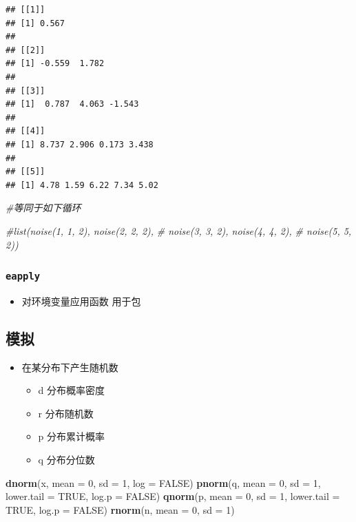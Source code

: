 \documentclass[]{book}
\newenvironment{Shaded}{\begin{snugshade}}{\end{snugshade}}
\newcommand{\CommentTok}[1]{\textcolor[rgb]{0.56,0.35,0.01}{\textit{#1}}}
\newcommand{\DataTypeTok}[1]{\textcolor[rgb]{0.13,0.29,0.53}{#1}}
\newcommand{\DecValTok}[1]{\textcolor[rgb]{0.00,0.00,0.81}{#1}}
\newcommand{\KeywordTok}[1]{\textcolor[rgb]{0.13,0.29,0.53}{\textbf{#1}}}
\newcommand{\NormalTok}[1]{#1}
\newcommand{\OtherTok}[1]{\textcolor[rgb]{0.56,0.35,0.01}{#1}}
\providecommand{\tightlist}{%
  \setlength{\itemsep}{0pt}\setlength{\parskip}{0pt}}
\begin{document}
\begin{verbatim}
## [[1]]
## [1] 0.567
## 
## [[2]]
## [1] -0.559  1.782
## 
## [[3]]
## [1]  0.787  4.063 -1.543
## 
## [[4]]
## [1] 8.737 2.906 0.173 3.438
## 
## [[5]]
## [1] 4.78 1.59 6.22 7.34 5.02
\end{verbatim}

\begin{Shaded}
\begin{Highlighting}[]
\CommentTok{#等同于如下循环}

\CommentTok{#list(noise(1, 1, 2), noise(2, 2, 2),}
\CommentTok{#    noise(3, 3, 2), noise(4, 4, 2),}
\CommentTok{#    noise(5, 5, 2))}
\end{Highlighting}
\end{Shaded}

\hypertarget{eapply}{%
\subsubsection{\texorpdfstring{\texttt{eapply}}{eapply}}\label{eapply}}

\begin{itemize}
\tightlist
\item
  对环境变量应用函数 用于包
\end{itemize}

\subsection{模拟}

\begin{itemize}
\tightlist
\item
  在某分布下产生随机数

  \begin{itemize}
  \tightlist
  \item
    d 分布概率密度
  \item
    r 分布随机数
  \item
    p 分布累计概率
  \item
    q 分布分位数
  \end{itemize}
\end{itemize}

\begin{Shaded}
\begin{Highlighting}[]
\KeywordTok{dnorm}\NormalTok{(x, }\DataTypeTok{mean =} \DecValTok{0}\NormalTok{, }\DataTypeTok{sd =} \DecValTok{1}\NormalTok{, }\DataTypeTok{log =} \OtherTok{FALSE}\NormalTok{)}
\KeywordTok{pnorm}\NormalTok{(q, }\DataTypeTok{mean =} \DecValTok{0}\NormalTok{, }\DataTypeTok{sd =} \DecValTok{1}\NormalTok{, }\DataTypeTok{lower.tail =} \OtherTok{TRUE}\NormalTok{, }\DataTypeTok{log.p =} \OtherTok{FALSE}\NormalTok{)}
\KeywordTok{qnorm}\NormalTok{(p, }\DataTypeTok{mean =} \DecValTok{0}\NormalTok{, }\DataTypeTok{sd =} \DecValTok{1}\NormalTok{, }\DataTypeTok{lower.tail =} \OtherTok{TRUE}\NormalTok{, }\DataTypeTok{log.p =} \OtherTok{FALSE}\NormalTok{)}
\KeywordTok{rnorm}\NormalTok{(n, }\DataTypeTok{mean =} \DecValTok{0}\NormalTok{, }\DataTypeTok{sd =} \DecValTok{1}\NormalTok{)}
\end{Highlighting}
\end{Shaded}
\end{document}
